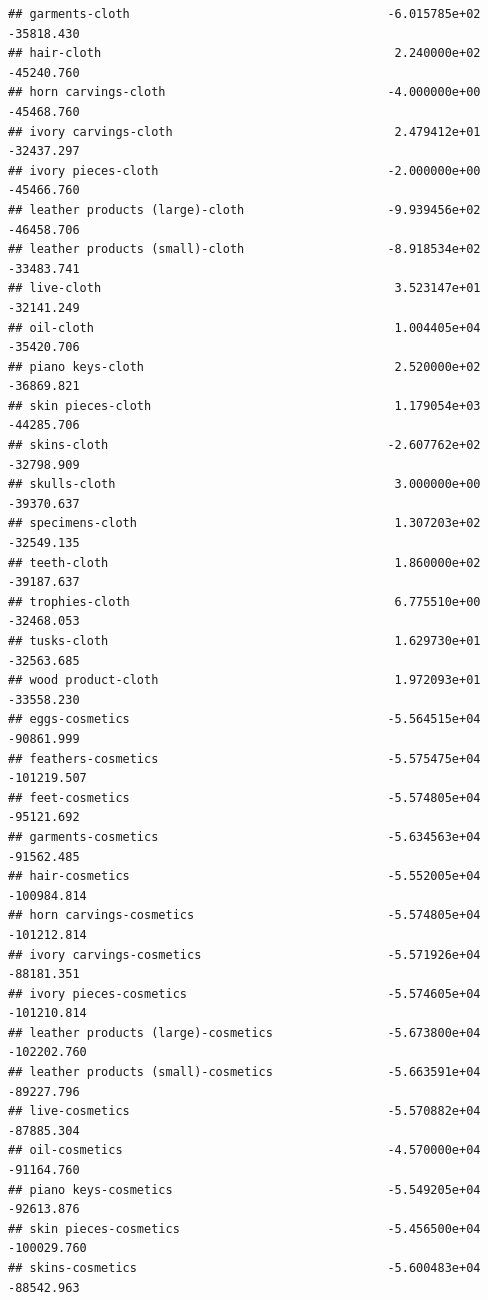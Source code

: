 \documentclass[
  12pt,
]{article}
\begin{document}
\begin{verbatim}
## garments-cloth                                    -6.015785e+02  -35818.430
## hair-cloth                                         2.240000e+02  -45240.760
## horn carvings-cloth                               -4.000000e+00  -45468.760
## ivory carvings-cloth                               2.479412e+01  -32437.297
## ivory pieces-cloth                                -2.000000e+00  -45466.760
## leather products (large)-cloth                    -9.939456e+02  -46458.706
## leather products (small)-cloth                    -8.918534e+02  -33483.741
## live-cloth                                         3.523147e+01  -32141.249
## oil-cloth                                          1.004405e+04  -35420.706
## piano keys-cloth                                   2.520000e+02  -36869.821
## skin pieces-cloth                                  1.179054e+03  -44285.706
## skins-cloth                                       -2.607762e+02  -32798.909
## skulls-cloth                                       3.000000e+00  -39370.637
## specimens-cloth                                    1.307203e+02  -32549.135
## teeth-cloth                                        1.860000e+02  -39187.637
## trophies-cloth                                     6.775510e+00  -32468.053
## tusks-cloth                                        1.629730e+01  -32563.685
## wood product-cloth                                 1.972093e+01  -33558.230
## eggs-cosmetics                                    -5.564515e+04  -90861.999
## feathers-cosmetics                                -5.575475e+04 -101219.507
## feet-cosmetics                                    -5.574805e+04  -95121.692
## garments-cosmetics                                -5.634563e+04  -91562.485
## hair-cosmetics                                    -5.552005e+04 -100984.814
## horn carvings-cosmetics                           -5.574805e+04 -101212.814
## ivory carvings-cosmetics                          -5.571926e+04  -88181.351
## ivory pieces-cosmetics                            -5.574605e+04 -101210.814
## leather products (large)-cosmetics                -5.673800e+04 -102202.760
## leather products (small)-cosmetics                -5.663591e+04  -89227.796
## live-cosmetics                                    -5.570882e+04  -87885.304
## oil-cosmetics                                     -4.570000e+04  -91164.760
## piano keys-cosmetics                              -5.549205e+04  -92613.876
## skin pieces-cosmetics                             -5.456500e+04 -100029.760
## skins-cosmetics                                   -5.600483e+04  -88542.963

\end{verbatim}
\end{document}
